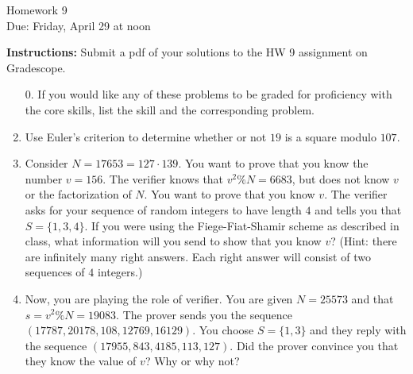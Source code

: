 \documentclass[12pt]{article}
\begin{document}
\begin{center}
{\Large Homework 9}\\
Due: Friday,  April 29 at noon\\


\end{center}
{\bf Instructions:} Submit a pdf of your solutions to the HW 9 assignment on Gradescope. 



\begin{enumerate}
\item[0.] If you would like any of these problems to be graded for proficiency with the core skills, list the skill and the corresponding problem. 


\item Use Euler's criterion to determine whether or not $19$ is a square modulo $107$. 

\item Consider $N=17653=127\cdot 139$. You want to prove that you know the number $v=156$. The verifier knows that $v^2\%N=6683$, but does not know $v$ or the factorization of $N$. You want to prove that you know $v$.  The verifier asks for your sequence of random integers to have length $4$ and tells you that $S=\{1,3,4\}$. If you were using the Fiege-Fiat-Shamir scheme as described in class, what information will you send to show that you know $v$? (Hint: there are infinitely many right answers. Each right answer will consist of two sequences of $4$ integers.)

\item Now, you are playing the role of verifier.  You are given $N=25573$ and that $s=v^2\%N=19083$. The prover sends you the sequence $(17787,20178,108,12769,16129)$. You choose $S=\{1,3\}$ and they reply with the sequence $(17955,843,4185,113,127)$. Did the prover convince you that they know the value of $v$? Why or why not?

 

\end{enumerate}
\end{document}
